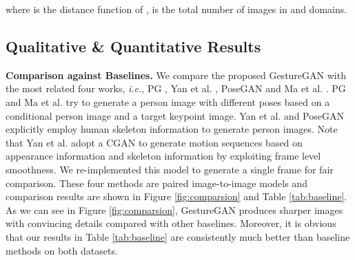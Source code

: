\documentclass[sigconf]{acmart}
\begin{document}
where  is the distance function of ,  is the total number of images in  and  domains.

\subsection{Qualitative \& Quantitative Results}
\noindent \textbf{Comparison against Baselines.}
We compare the proposed GestureGAN with the most related four works,
\textit{i.e.}, PG \cite{ma2017pose}, Yan et al. \cite{yan2017skeleton}, PoseGAN \cite{siarohin2017deformable} and Ma et al. \cite{ma2017disentangled}.
PG \cite{ma2017pose} and Ma et al. \cite{ma2017disentangled} try to generate a person image with different poses based on a conditional person image and a target keypoint image.
Yan et al. \cite{yan2017skeleton} and PoseGAN \cite{siarohin2017deformable} explicitly employ human skeleton information to generate person images.  
Note that Yan et al. \cite{yan2017skeleton} adopt a CGAN to generate motion sequences based on appearance information and skeleton information by exploiting frame level smoothness.
We re-implemented this model to generate a single frame for fair comparison. 
These four methods are paired image-to-image models and comparison results are shown in Figure \ref{fig:comparsion} and Table \ref{tab:baseline}.
As we can see in Figure \ref{fig:comparsion}, GestureGAN produces sharper images with convincing details compared with other baselines.
Moreover, it is obvious that our results in Table \ref{tab:baseline} are consistently much better than baseline methods on both datasets.
\end{document}
